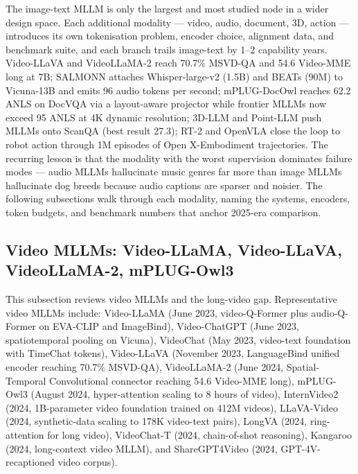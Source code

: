 The image-text MLLM is only the largest and most studied node in a wider design space. Each additional modality --- video, audio, document, 3D, action --- introduces its own tokenisation problem, encoder choice, alignment data, and benchmark suite, and each branch trails image-text by 1--2 capability years. Video-LLaVA and VideoLLaMA-2 reach 70.7\% MSVD-QA and 54.6 Video-MME long at 7B; SALMONN attaches Whisper-large-v2 (1.5B) and BEATs (90M) to Vicuna-13B and emits 96 audio tokens per second; mPLUG-DocOwl reaches 62.2 ANLS on DocVQA via a layout-aware projector while frontier MLLMs now exceed 95 ANLS at 4K dynamic resolution; 3D-LLM and Point-LLM push MLLMs onto ScanQA (best result 27.3); RT-2 and OpenVLA close the loop to robot action through 1M episodes of Open X-Embodiment trajectories. The recurring lesson is that the modality with the worst supervision dominates failure modes --- audio MLLMs hallucinate music genres far more than image MLLMs hallucinate dog breeds because audio captions are sparser and noisier. The following subsections walk through each modality, naming the systems, encoders, token budgets, and benchmark numbers that anchor 2025-era comparison.

\subsection{Video MLLMs: Video-LLaMA, Video-LLaVA, VideoLLaMA-2, mPLUG-Owl3}\label{video-mllms-video-llama-video-llava-videollama-2-mplug-owl3}

This subsection reviews video MLLMs and the long-video gap. Representative video MLLMs include: Video-LLaMA (June 2023, video-Q-Former plus audio-Q-Former on EVA-CLIP and ImageBind), Video-ChatGPT (June 2023, spatiotemporal pooling on Vicuna), VideoChat (May 2023, video-text foundation with TimeChat tokens), Video-LLaVA (November 2023, LanguageBind unified encoder reaching 70.7\% MSVD-QA), VideoLLaMA-2 (June 2024, Spatial-Temporal Convolutional connector reaching 54.6 Video-MME long), mPLUG-Owl3 (August 2024, hyper-attention scaling to 8 hours of video), InternVideo2 (2024, 1B-parameter video foundation trained on 412M videos), LLaVA-Video (2024, synthetic-data scaling to 178K video-text pairs), LongVA (2024, ring-attention for long video), VideoChat-T (2024, chain-of-shot reasoning), Kangaroo (2024, long-context video MLLM), and ShareGPT4Video (2024, GPT-4V-recaptioned video corpus).

